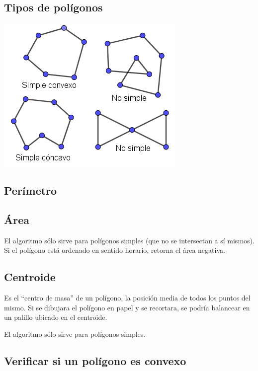 \documentclass{article}
\begin{document}
\begin{multicols}{2}
\subsection{Tipos de polígonos}
\includegraphics[width=0.6\columnwidth]{poligonos}

\subsection{Perímetro}


\subsection{Área}
El algoritmo sólo sirve para polígonos simples (que no se intersectan a sí mismos). Si el polígono está ordenado en sentido horario, retorna el área negativa.


\subsection{Centroide}
Es el ``centro de masa'' de un polígono, la posición media de todos los puntos del mismo. Si se dibujara el polígono en papel y se recortara, se podría balancear en un palillo ubicado en el centroide. 

El algoritmo sólo sirve para polígonos simples.



\subsection{Verificar si un polígono es convexo}



\end{multicols}
\end{document}
